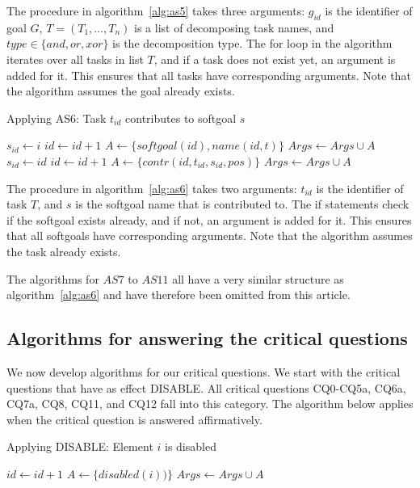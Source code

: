 \rationale{} The procedure in algorithm~\ref{alg:as5} takes three arguments: $g_{id}$ is the identifier of goal $G$, $T=(T_1,\ldots,T_n)$ is a list of decomposing task names, and $type\in\{and,or,xor\}$ is the decomposition type. The for loop in the algorithm iterates over all tasks in list $T$, and if a task does not exist yet, an argument is added for it. This ensures that all tasks have corresponding arguments. Note that the algorithm assumes the goal already exists.

\begin{algorithm}[h]
  \caption{Applying AS6: Task $t_{id}$ contributes to softgoal $s$}\label{alg:as6}
  \begin{algorithmic}[1]
        \State $s_{id} \gets i$
    \Else
      \State $id\gets id+1$
      \State $A \gets \{softgoal(id),name(id,t)\}$
      \State $Args \gets Args\cup A$
      \State $s_{id} \gets id$
    \EndIf
    \State $id\gets id+1$
    \State $A\gets \{contr(id, t_{id}, s_{id}, pos)\}$
    \State $Args \gets Args\cup A$
    \EndProcedure
  \end{algorithmic}
\end{algorithm}

\rationale{} The procedure in algorithm~\ref{alg:as6} takes two arguments: $t_{id}$ is the identifier of task $T$, and $s$ is the softgoal name that is contributed to. The if statements check if the softgoal exists already, and if not, an argument is added for it. This ensures that all softgoals have corresponding arguments. Note that the algorithm assumes the task already exists.

The algorithms for $AS7$ to $AS11$ all have a very similar structure as algorithm~\ref{alg:as6} and have therefore been omitted from this article.

\subsection{Algorithms for answering the critical questions}

We now develop algorithms for our critical questions. We start with the critical questions that have as effect DISABLE. All critical questions CQ0-CQ5a, CQ6a, CQ7a, CQ8, CQ11, and CQ12 fall into this category. The algorithm below applies when the critical question is answered affirmatively.

\begin{algorithm}[h]
  \caption{Applying DISABLE: Element $i$ is disabled}\label{alg:disable}
  \begin{algorithmic}[1]
    \State $id\gets id+1$
    \State $A\gets \{disabled(i))\}$
    \State $Args \gets Args\cup A$
    \EndProcedure
  \end{algorithmic}
\end{algorithm}

